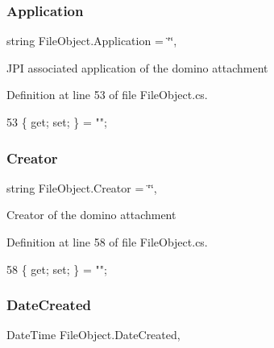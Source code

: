 \subsubsection{\texorpdfstring{Application}{Application}}
{\footnotesize\ttfamily string File\+Object.\+Application = \char`\"{}\char`\"{}\hspace{0.3cm}{\ttfamily [get]}, {\ttfamily [set]}}



J\+PI associated application of the domino attachment 



Definition at line 53 of file File\+Object.\+cs.


\begin{DoxyCode}
53 \{ \textcolor{keyword}{get}; \textcolor{keyword}{set}; \} = \textcolor{stringliteral}{""};
\end{DoxyCode}
\mbox{\label{class_file_object_a1ab7d29c80841b60b276b7430f4e5ec7}} 
\subsubsection{\texorpdfstring{Creator}{Creator}}
{\footnotesize\ttfamily string File\+Object.\+Creator = \char`\"{}\char`\"{}\hspace{0.3cm}{\ttfamily [get]}, {\ttfamily [set]}}



Creator of the domino attachment 



Definition at line 58 of file File\+Object.\+cs.


\begin{DoxyCode}
58 \{ \textcolor{keyword}{get}; \textcolor{keyword}{set}; \} = \textcolor{stringliteral}{""};
\end{DoxyCode}
\mbox{\label{class_file_object_a372b9a7dad068368526b0698550f9504}} 
\subsubsection{\texorpdfstring{Date\+Created}{DateCreated}}
{\footnotesize\ttfamily Date\+Time File\+Object.\+Date\+Created\hspace{0.3cm}{\ttfamily [get]}, {\ttfamily [set]}}



